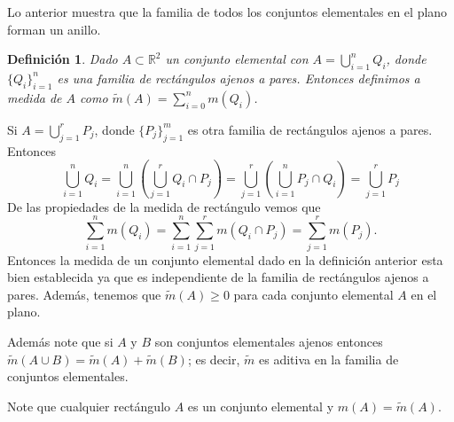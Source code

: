 \documentclass[twoside,12pt,a4 paper,openright]{book}
\newtheorem{defi}[claim]{Definici\'on}
\begin{document}
Lo anterior muestra que la familia de todos los conjuntos elementales en el plano forman un anillo. 




\begin{defi}
Dado $A\subset \mathbb R^2$ un conjunto elemental con $A= \bigcup_{i=1}^n Q_i
$,  donde $\{Q_i  \}_{i=1}^n$ es una familia de rect\'angulos ajenos a  pares. Entonces definimos a medida de $A$ como $\tilde{m}(A)= \sum_{i=0}^n m(Q_i)$. 

\end{defi}

 Si   $A= \bigcup_{j=1}^r P_j
$,  donde $\{P_j  \}_{j=1}^m$ es otra familia de rect\'angulos ajenos a  pares. Entonces 
$$   \bigcup_{i=1}^n Q_i =  \bigcup_{i=1}^n ( \bigcup_{j=1}^r 
  Q_i \cap  P_j ) = \bigcup_{j=1}^r ( \bigcup_{i=1}^n 
   P_j  \cap  Q_i )  =   \bigcup_{j=1}^r P_j  $$
   De las propiedades de la medida de rect\'angulo vemos que
   $$   \sum_{i=1}^n m(Q_i) = \sum_{i=1}^n \sum_{j=1}^r 
 m( Q_i \cap  P_j )= \sum _{j=1}^r m(P_j).  $$
     Entonces la medida de un conjunto elemental dado en la definici\'on anterior esta bien establecida ya que es independiente de la familia de rect\'angulos ajenos a pares. Adem\'as,   tenemos que 
     $\tilde{m}(A) \geq 0$ para cada conjunto elemental $A$ en el plano. 
     
Adem\'as note que si  $A$ y $B$ son conjuntos elementales ajenos entonces   
     $\tilde{m}(A \cup B) = \tilde{m}(A  ) + \tilde{m}(  B)$; es decir, $\tilde{m} $ es aditiva en la familia de conjuntos elementales.  
 


Note que cualquier rect\'angulo $A$ es un conjunto elemental y $m(A) =\tilde{ m
}(A) $.     
     
\end{document}
